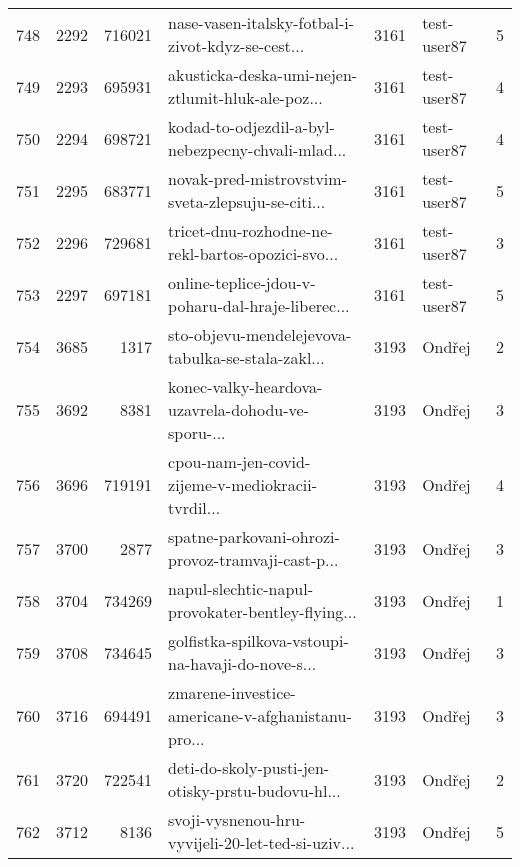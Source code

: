 \begin{tabular}{lrrlrlr}
748  &       2292 &   716021 &  nase-vasen-italsky-fotbal-i-zivot-kdyz-se-cest... &     3161 &                  test-user87 &               5 \\
749  &       2293 &   695931 &  akusticka-deska-umi-nejen-ztlumit-hluk-ale-poz... &     3161 &                  test-user87 &               4 \\
750  &       2294 &   698721 &  kodad-to-odjezdil-a-byl-nebezpecny-chvali-mlad... &     3161 &                  test-user87 &               4 \\
751  &       2295 &   683771 &  novak-pred-mistrovstvim-sveta-zlepsuju-se-citi... &     3161 &                  test-user87 &               5 \\
752  &       2296 &   729681 &  tricet-dnu-rozhodne-ne-rekl-bartos-opozici-svo... &     3161 &                  test-user87 &               3 \\
753  &       2297 &   697181 &  online-teplice-jdou-v-poharu-dal-hraje-liberec... &     3161 &                  test-user87 &               5 \\
754  &       3685 &     1317 &  sto-objevu-mendelejevova-tabulka-se-stala-zakl... &     3193 &                       Ondřej &               2 \\
755  &       3692 &     8381 &  konec-valky-heardova-uzavrela-dohodu-ve-sporu-... &     3193 &                       Ondřej &               3 \\
756  &       3696 &   719191 &  cpou-nam-jen-covid-zijeme-v-mediokracii-tvrdil... &     3193 &                       Ondřej &               4 \\
757  &       3700 &     2877 &  spatne-parkovani-ohrozi-provoz-tramvaji-cast-p... &     3193 &                       Ondřej &               3 \\
758  &       3704 &   734269 &  napul-slechtic-napul-provokater-bentley-flying... &     3193 &                       Ondřej &               1 \\
759  &       3708 &   734645 &  golfistka-spilkova-vstoupi-na-havaji-do-nove-s... &     3193 &                       Ondřej &               3 \\
760  &       3716 &   694491 &  zmarene-investice-americane-v-afghanistanu-pro... &     3193 &                       Ondřej &               3 \\
761  &       3720 &   722541 &  deti-do-skoly-pusti-jen-otisky-prstu-budovu-hl... &     3193 &                       Ondřej &               2 \\
762  &       3712 &     8136 &  svoji-vysnenou-hru-vyvijeli-20-let-ted-si-uziv... &     3193 &                       Ondřej &               5 \\

\end{tabular}
